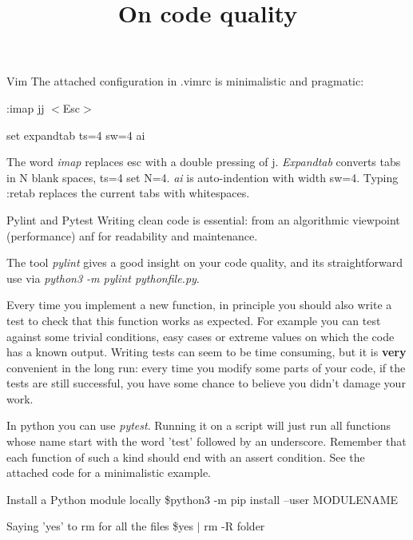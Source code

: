 \documentclass[10pt]{article}
\title {On code quality}
\begin{document}
\maketitle

\begin{section}{Vim}
The attached configuration in .vimrc is minimalistic and pragmatic:


:imap jj $<$Esc$>$


set expandtab ts=4 sw=4 ai


The word \emph{imap} replaces esc with a double pressing of j.
\emph{Expandtab} converts tabs in N blank spaces, ts=4 set N=4.
\emph{ai} is auto-indention with width sw=4.
Typing :retab replaces the current tabs
with whitespaces.
\end{section}


\begin{section}{Pylint and Pytest}
Writing clean code is essential: from an algorithmic viewpoint 
(performance) anf for readability and maintenance.


The tool \emph{pylint} gives a good insight on your code quality,
and its straightforward use via \emph{python3 -m pylint pythonfile.py}.


Every time you implement a new function, 
in principle you should also
write a test to check that this function works as expected.
For example you can test against some trivial conditions, easy
cases or extreme values on which the code has a known output.
Writing tests can seem to be time consuming, but it is
\textbf{very} 
convenient in the long run: every time you modify some parts of your code,
if the tests are still successful, you have some chance to believe you didn't
damage your work.


In python you can use \emph{pytest}. Running it on a script will just run
all functions whose name start with the word 'test' followed by an underscore.
Remember that each function of such a kind should end with an assert condition.
See the attached code for a minimalistic example.
\end{section}

\begin{section}{Install a Python module locally}
\$python3 -m pip install --user MODULENAME
\end{section}

\begin{section}{Saying 'yes' to rm for all the files}
\$yes $|$ rm -R folder
\end{section}
\end{document}
